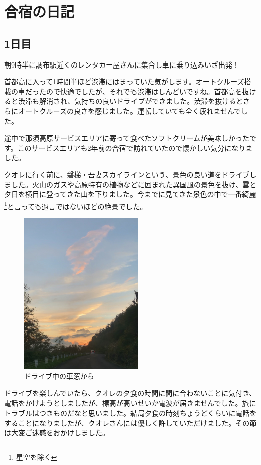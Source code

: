 \documentclass[../main]{subfiles}
\begin{document}
\section{合宿の日記}
\subsection{1日目}
朝9時半に調布駅近くのレンタカー屋さんに集合し車に乗り込みいざ出発！


首都高に入って1時間半ほど渋滞にはまっていた気がします。オートクルーズ搭載の車だったので快適でしたが、それでも渋滞はしんどいですね。首都高を抜けると渋滞も解消され、気持ちの良いドライブができました。渋滞を抜けるとさらにオートクルーズの良さを感じました。運転していても全く疲れませんでした。

途中で那須高原サービスエリアに寄って食べたソフトクリームが美味しかったです。このサービスエリアも2年前の合宿で訪れていたので懐かしい気分になりました。


クオレに行く前に、磐梯・吾妻スカイラインという、景色の良い道をドライブしました。火山のガスや高原特有の植物などに囲まれた異国風の景色を抜け、雲と夕日を横目に登ってきた山を下りました。今までに見てきた景色の中で一番綺麗\footnote{星空を除く}と言っても過言ではないほどの絶景でした。

\begin{figure}[H]
\includegraphics[width=6cm]{sections/Nakahara/IMG_8501.jpg}
\centering
\caption{ドライブ中の車窓から}
\end{figure}

ドライブを楽しんでいたら、クオレの夕食の時間に間に合わないことに気付き、電話をかけようとしましたが、標高が高いせいか電波が届きませんでした。旅にトラブルはつきものだなと思いました。結局夕食の時刻ちょうどくらいに電話をすることになりましたが、クオレさんには優しく許していただけました。その節は大変ご迷惑をおかけしました。
\end{document}
